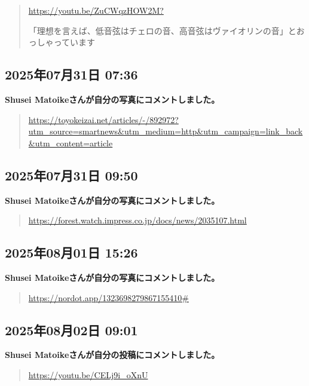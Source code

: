 \begin{quote}
\url{https://youtu.be/ZuCWqzHOW2M?}

「理想を言えば、低音弦はチェロの音、高音弦はヴァイオリンの音」とおっしゃっています
\end{quote}

\subsection*{2025年07月31日 07:36}

\textbf{Shusei Matoikeさんが自分の写真にコメントしました。}

\begin{quote}
\url{https://toyokeizai.net/articles/-/892972?utm_source=smartnews&utm_medium=http&utm_campaign=link_back&utm_content=article}
\end{quote}

\subsection*{2025年07月31日 09:50}

\textbf{Shusei Matoikeさんが自分の写真にコメントしました。}

\begin{quote}
\url{https://forest.watch.impress.co.jp/docs/news/2035107.html}
\end{quote}

\subsection*{2025年08月01日 15:26}

\textbf{Shusei Matoikeさんが自分の写真にコメントしました。}

\begin{quote}
\url{https://nordot.app/1323698279867155410\#}
\end{quote}

\subsection*{2025年08月02日 09:01}

\textbf{Shusei Matoikeさんが自分の投稿にコメントしました。}

\begin{quote}
\url{https://youtu.be/CELj9i_oXnU}
\end{quote}

